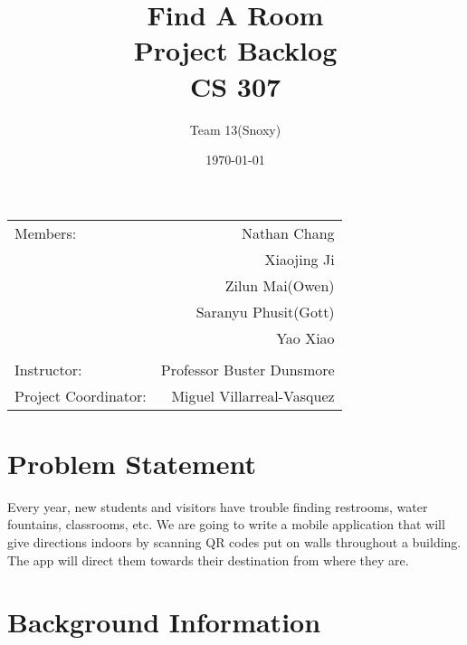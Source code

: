 \documentclass[12pt]{article}
\title{\textbf{Find A Room} \\ Project Backlog \\ CS 307} %
\author{Team \textsc{13}(Snoxy)} %
\date{\today} %
\begin{document}
\maketitle %

\begin{center}
\begin{tabular}{l r}
Members: & Nathan Chang \\ %
& Xiaojing Ji \\
& Zilun Mai(Owen) \\
& Saranyu Phusit(Gott) \\
& Yao Xiao \\
\\
\bigskip
Instructor: & Professor Buster Dunsmore \\%
Project Coordinator: & Miguel Villarreal-Vasquez %

\end{tabular}
\end{center}




\newpage
\section{Problem Statement}

Every year, new students and visitors have trouble finding restrooms, water fountains, classrooms, etc. We are going to write a mobile application that will give directions indoors by scanning QR codes put on walls throughout a building. The app will direct them towards their destination from where they are.


\section{Background Information}
\end{document}
